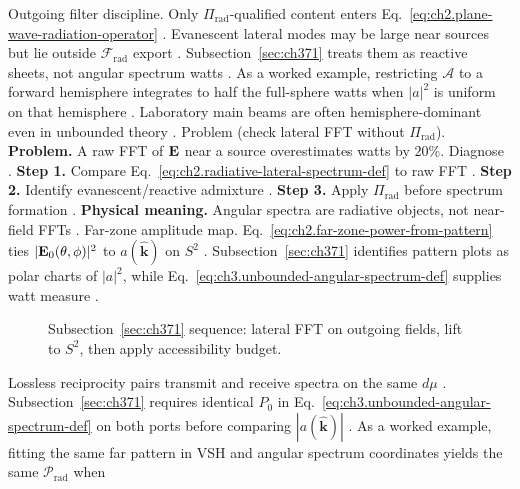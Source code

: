 Outgoing filter discipline. Only \(\Pi_{\mathrm{rad}}\)-qualified content enters Eq.~\eqref{eq:ch2.plane-wave-radiation-operator}
\cite{harrington2001}. Evanescent lateral modes may be large near sources but lie outside
\(\mathcal{F}_{\mathrm{rad}}\) export \cite{stratton1941}. Subsection~\ref{sec:ch371} treats them as
reactive sheets, not angular spectrum watts \cite{harrington2001}.
As a worked example, restricting \(\mathcal{A}\) to a forward hemisphere integrates to half the full-sphere watts when
\(|a|^{2}\) is uniform on that hemisphere \cite{jackson1999}. Laboratory main beams are often
hemisphere-dominant even in unbounded theory \cite{stratton1941}.
Problem (check lateral FFT without \(\Pi_{\mathrm{rad}}\)). \textbf{Problem.} A raw FFT of \(\mathbf{E}\) near a source overestimates watts by \(20\%\). Diagnose
\cite{harrington2001}.
\textbf{Step 1.} Compare Eq.~\eqref{eq:ch2.radiative-lateral-spectrum-def} to raw FFT \cite{stratton1941}.
\textbf{Step 2.} Identify evanescent/reactive admixture \cite{harrington2001}.
\textbf{Step 3.} Apply \(\Pi_{\mathrm{rad}}\) before spectrum formation \cite{stratton1941}.
\textbf{Physical meaning.} Angular spectra are radiative objects, not near-field FFTs \cite{harrington2001}.
Far-zone amplitude map. Eq.~\eqref{eq:ch2.far-zone-power-from-pattern} ties \(|\mathbf{E}_{0}(\theta,\phi)|^{2}\) to \(a(\widehat{\mathbf{k}})\) on
\(S^{2}\) \cite{stratton1941}. Subsection~\ref{sec:ch371} identifies pattern plots as polar charts of
\(|a|^{2}\), while Eq.~\eqref{eq:ch3.unbounded-angular-spectrum-def} supplies watt measure \cite{poynting1884}.
\begin{figure}[t]
\centering
{}
\caption{Subsection~\ref{sec:ch371} sequence: lateral FFT on outgoing fields, lift to \(S^{2}\), then apply accessibility
budget.}
\label{fig:ch3.371-lateral-to-sphere}
\end{figure}
Lossless reciprocity pairs transmit and receive spectra on the same \(d\mu\) \cite{stratton1941}.
Subsection~\ref{sec:ch371} requires identical \(P_{0}\) in Eq.~\eqref{eq:ch3.unbounded-angular-spectrum-def} on both
ports before comparing \(|a(\widehat{\mathbf{k}})|\) \cite{hansen1988}.
As a worked example, fitting the same far pattern in VSH and angular spectrum coordinates yields the same \(\mathcal{P}_{\mathrm{rad}}\) when
